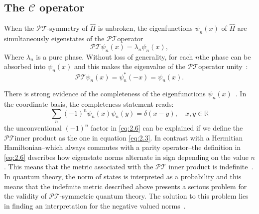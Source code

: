 \documentclass[12pt, a4paper]{report}
\newcommand\PT{\(\mathcal{PT}\)}
\begin{document}
\subsection{The $\mathcal{C}$ operator}\label{CC}
When the \PT-symmetry of $\hat{H}$ is unbroken, the eigenfunctions $\psi_n(x)$ of $\hat{H}$ are simultaneously eigenstates of the \PT\:operator~\cite{Bender_2004}
\begin{equation}\label{eq:2.4}
\mathcal{PT}\psi_n(x) = \lambda_n \psi_n(x),
\end{equation}
Where $\lambda_n$ is a pure phase. Without loss of generality, for each $n$\:the phase can be absorbed into $\psi_n(x)$ and this makes the eigenvalue of the \PT operator unity~\cite{Bender_2004}: 
\begin{equation}\label{eq:2.5}
\mathcal{PT}\psi_n(x) = \psi_{n}^{*}(-x) = \psi_n(x).
\end{equation}

There is strong evidence of the completeness of the eigenfunctions $\psi_n(x)$~\cite{ComplexExtension, Bender_2004, Brody_2013}. In the coordinate basis, the completeness statement reads:
\begin{equation}\label{eq:2.6}
\sum_{n}(-1)^{n}\psi_n(x)\psi_n(y) = \delta(x-y),\quad x, y \in \mathbb{R}
\end{equation}
the unconventional $(-1)^n$ factor in \ref{eq:2.6} can be explained if we define the \PT\:inner product as the one in equation \ref{eq:2.3}. In contrast with a Hermitian Hamiltonian--which always commutes with a parity operator--the definition in \ref{eq:2.6} describes how eigenstate norms alternate in sign depending on the value $n$. 
This means that the metric associated with the \PT\: inner product is indefinite~\cite{Bender_2004,Critique}.
In quantum theory, the norm of states is interpreted as a probability and this means that the indefinite metric described above presents a serious problem for the validity of \PT-symmetric quantum theory. The solution to this problem lies in finding an interpretation for the negative valued norms~\cite{PTsymmetricQM}.
\end{document}
